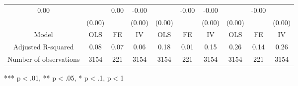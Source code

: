 \begin{tabular}{llllllllll}
  \multicolumn{1}{|c}{0.00 } &
  \multicolumn{1}{c}{} &
  \multicolumn{1}{c}{0.00 } &
  \multicolumn{1}{c}{-0.00 } &
  \multicolumn{1}{c}{} &
  \multicolumn{1}{c}{-0.00 } &
  \multicolumn{1}{c}{-0.00 } &
  \multicolumn{1}{c}{} &
  \multicolumn{1}{c}{-0.00 } \\
\multicolumn{1}{l}{} &
  \multicolumn{1}{|r}{(0.00)} &
  \multicolumn{1}{r}{} &
  \multicolumn{1}{r}{(0.00)} &
  \multicolumn{1}{r}{(0.00)} &
  \multicolumn{1}{r}{} &
  \multicolumn{1}{r}{(0.00)} &
  \multicolumn{1}{r}{(0.00)} &
  \multicolumn{1}{r}{} &
  \multicolumn{1}{r}{(0.00)} \\
\multicolumn{1}{c}{Model} &
  \multicolumn{1}{|c}{OLS} &
  \multicolumn{1}{c}{FE} &
  \multicolumn{1}{c}{IV} &
  \multicolumn{1}{c}{OLS} &
  \multicolumn{1}{c}{FE} &
  \multicolumn{1}{c}{IV} &
  \multicolumn{1}{c}{OLS} &
  \multicolumn{1}{c}{FE} &
  \multicolumn{1}{c}{IV} \\
\multicolumn{1}{c}{Adjusted R-squared} &
  \multicolumn{1}{|c}{0.08} &
  \multicolumn{1}{c}{0.07} &
  \multicolumn{1}{c}{0.06} &
  \multicolumn{1}{c}{0.18} &
  \multicolumn{1}{c}{0.01} &
  \multicolumn{1}{c}{0.15} &
  \multicolumn{1}{c}{0.26} &
  \multicolumn{1}{c}{0.14} &
  \multicolumn{1}{c}{0.26} \\
\multicolumn{1}{c}{Number of observations} &
  \multicolumn{1}{|c}{3154} &
  \multicolumn{1}{c}{221} &
  \multicolumn{1}{c}{3154} &
  \multicolumn{1}{c}{3154} &
  \multicolumn{1}{c}{221} &
  \multicolumn{1}{c}{3154} &
  \multicolumn{1}{c}{3154} &
  \multicolumn{1}{c}{221} &
  \multicolumn{1}{c}{3154} \\
\cline{1-10}
\end{tabular}

\footnotesize{
*** p$<$.01, ** p$<$.05, * p$<$.1,  p$<$1
}
